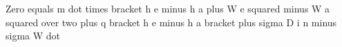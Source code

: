 Zero equals m dot times bracket h e minus h a plus W e squared minus W a squared over two plus q bracket h e minus h a bracket plus sigma D i n minus sigma W dot